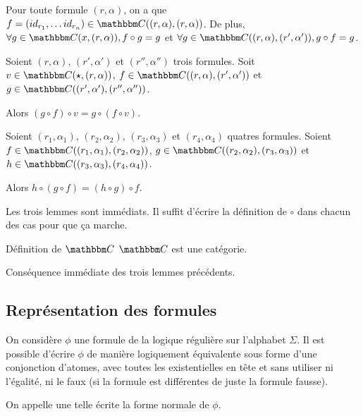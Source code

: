 \begin{lem}
    Pour toute formule $(r,\alpha)$, on a que
        $f=(id_{r_1},\dots id_{r_n})\in\C((r,\alpha),(r,\alpha))$.
    De plus, $\forall g\in\C(x, (r,\alpha)), f\circ g = g$
    et $\forall g\in\C((r,\alpha), (r',\alpha')), g\circ f = g$.
\end{lem}

\begin{lem}
    Soient $(r,\alpha)$, $(r',\alpha')$ et $(r'',\alpha'')$ trois formules.
    Soit $v\in\C(\star,(r,\alpha))$,
    $f\in\C((r,\alpha), (r',\alpha'))$ et $g\in\C((r',\alpha'), (r'',\alpha''))$.

    Alors $(g\circ f)\circ v = g\circ (f\circ v)$.
\end{lem}

\begin{lem}
    Soient $(r_1,\alpha_1)$, $(r_2,\alpha_2)$, $(r_3,\alpha_3)$ et $(r_4,\alpha_4)$
    quatres formules.
    Soient $f\in\C((r_1,\alpha_1), (r_2,\alpha_2))$,
    $g\in\C((r_2,\alpha_2), (r_3,\alpha_3))$ et $h\in\C((r_3,\alpha_3),(r_4,\alpha_4))$.

    Alors $h\circ(g\circ f) = (h\circ g)\circ f$.
\end{lem}

\begin{pv} Les trois lemmes sont immédiats. Il suffit d'écrire la définition de $\circ$
    dans chacun des cas pour que ça marche.
\end{pv}

\begin{theo}{Définition de $\C$}
    $\C$ est une catégorie.
\end{theo}

\begin{pv} Conséquence immédiate des trois lemmes précédents.
\end{pv}

\subsection{Représentation des formules}

\begin{lem}
    On considère $\phi$ une formule de la logique régulière sur l'alphabet
    $\Sigma$.  Il est possible d'écrire $\phi$ de manière logiquement
    équivalente sous forme d'une conjonction d'atomes, avec toutes les
    existentielles en tête et sans utiliser ni l'égalité, ni le faux (si la
    formule est différentes de juste la formule fausse).

    On appelle une telle écrite la forme normale de $\phi$.
\end{lem}

